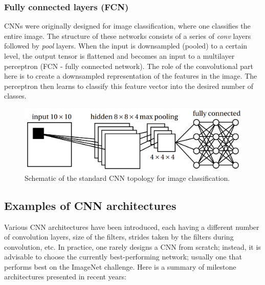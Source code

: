 \subsubsection{Fully connected layers (FCN)}

CNNs were originally designed for image classification, where one classifies the entire image. The structure of these networks consists of a series of \textit{conv} layers followed by \textit{pool} layers. When the input is downsampled (pooled) to a certain level, the output tensor is flattened and becomes an input to a multilayer perceptron (FCN - fully connected network). The role of the convolutional part here is to create a downsampled representation of the features in the image. The perceptron then learns to classify this feature vector into the desired number of classes. \cite{stanford-github} \cite{notes}

\vspace{4mm}
\begin{figure}[htb]
	\begin{center}
		\includegraphics*[width=12cm, keepaspectratio]{obr/fully.png}
	\end{center}
	\vspace{4mm}
	\caption{Schematic of the standard CNN topology for image classification. \cite{mehlig}} 
	\label{pool}
\end{figure}

\subsection{Examples of CNN architectures}

Various CNN architectures have been introduced, each having a different number of convolution layers, size of the filters, strides taken by the filters during convolution, etc. In practice, one rarely designs a CNN from scratch; instead, it is advisable to choose the currently best-performing network; usually one that performs best on the ImageNet challenge. \cite{stanford-github} Here is a summary of milestone architectures presented in recent years:

